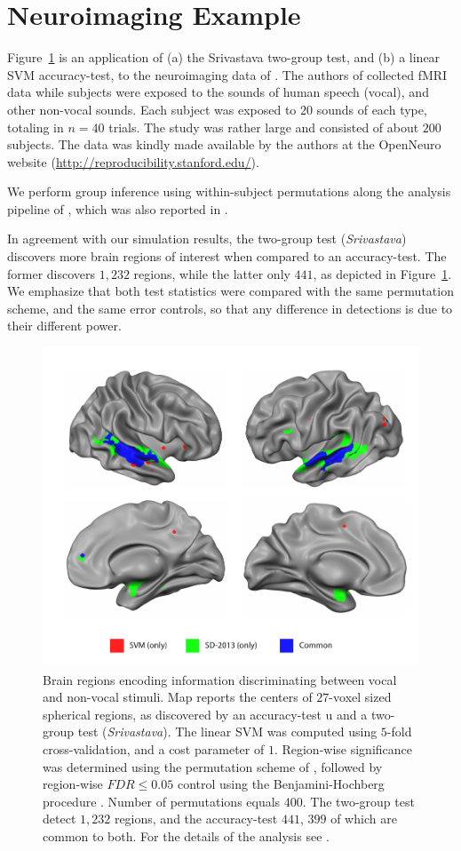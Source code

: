 \documentclass[]{bio}
\begin{document}
\section{Neuroimaging Example}
\label{sec:example}

Figure~\ref{fig:read_data} is an application of (a) the Srivastava two-group test, and (b) a linear SVM accuracy-test, to the neuroimaging data of \citet{pernet_human_2015}. 
The authors of \cite{pernet_human_2015} collected fMRI data while subjects were exposed to the sounds of human speech (vocal), and other non-vocal sounds. 
Each subject was exposed to $20$ sounds of each type, totaling in $n=40$ trials.
The study was rather large and consisted of about $200$ subjects.
The data was kindly made available by the authors at the OpenNeuro website (\url{http://reproducibility.stanford.edu/}).

We perform group inference using within-subject permutations along the analysis pipeline of \cite{stelzer_statistical_2013}, which was also reported in \cite{gilron_quantifying_2016}. 

In agreement with our simulation results, the two-group test (\emph{Srivastava}) discovers more brain regions of interest when compared to an accuracy-test.
The former discovers $1,232$ regions, while the latter only $441$, as depicted in Figure~\ref{fig:read_data}.
We emphasize that both test statistics were compared with the same permutation scheme, and the same error controls, so that any difference in detections is due to their different power.


\begin{figure}[th]
	\centering
	\includegraphics[width=0.5\columnwidth]{"art/svm_vs_SD"}
	\caption{\footnotesize
		Brain regions encoding information discriminating between vocal and non-vocal stimuli.
		Map reports the centers of $27$-voxel sized spherical regions, as discovered by an accuracy-test u and a two-group test (\emph{Srivastava}). 
		The linear SVM was computed using $5$-fold cross-validation, and a cost parameter of $1$. 
		Region-wise significance was determined using the permutation scheme of \cite{stelzer_statistical_2013}, followed by region-wise $FDR \leq 0.05$ control using the Benjamini-Hochberg procedure \citep{benjamini_controlling_1995}.
		Number of permutations equals $400$.
		The two-group test detect $1,232$ regions, and the accuracy-test $441$, $399$ of which are common to both.
		For the details of the analysis see \cite{gilron_quantifying_2016}.  
	}
	\label{fig:read_data}
\end{figure}
\end{document}

